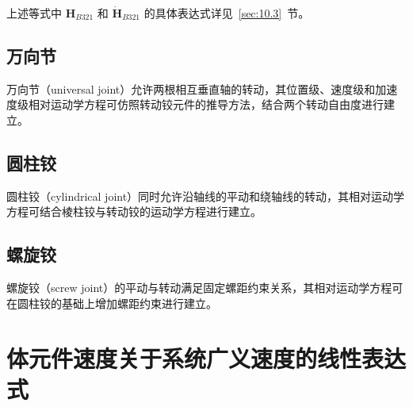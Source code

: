 上述等式中 $\boldsymbol{H}_{B321}$ 和 $\dot{\boldsymbol{H}}_{B321}$ 的具体表达式详见~\ref{sec:10.3}~节。

\subsection{万向节}

万向节（universal joint）允许两根相互垂直轴的转动，其位置级、速度级和加速度级相对运动学方程可仿照转动铰元件的推导方法，结合两个转动自由度进行建立。

\subsection{圆柱铰}

圆柱铰（cylindrical joint）同时允许沿轴线的平动和绕轴线的转动，其相对运动学方程可结合棱柱铰与转动铰的运动学方程进行建立。

\subsection{螺旋铰}

螺旋铰（screw joint）的平动与转动满足固定螺距约束关系，其相对运动学方程可在圆柱铰的基础上增加螺距约束进行建立。

\section{体元件速度关于系统广义速度的线性表达式}

